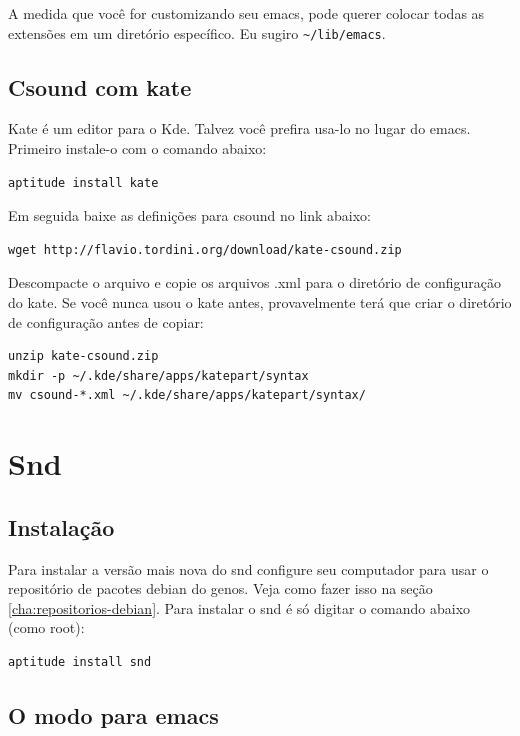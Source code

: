 \documentclass[12pt,brazil]{book}
\begin{document}
A medida que você for customizando seu emacs, pode querer colocar
todas as extensões em um diretório específico. Eu sugiro
\verb|~/lib/emacs|.

\section{Csound com kate}
\label{sec:csound-com-kate}

Kate é um editor para o Kde. Talvez você prefira usa-lo no lugar do
emacs. Primeiro instale-o com o comando abaixo:

\begin{verbatim}
aptitude install kate
\end{verbatim}

Em seguida baixe as definições para csound no link abaixo:

\begin{verbatim}
wget http://flavio.tordini.org/download/kate-csound.zip
\end{verbatim}

Descompacte o arquivo e copie os arquivos .xml para o diretório de
configuração do kate. Se você nunca usou o kate antes, provavelmente
terá que criar o diretório de configuração antes de copiar:

\begin{verbatim}
unzip kate-csound.zip
mkdir -p ~/.kde/share/apps/katepart/syntax
mv csound-*.xml ~/.kde/share/apps/katepart/syntax/
\end{verbatim}

\chapter{Snd}
\label{cha:snd}

\section{Instalação}
\label{sec:instalacao-5}

Para instalar a versão mais nova do snd configure seu computador para
usar o repositório de pacotes debian do genos. Veja como fazer isso na
seção \ref{cha:repositorios-debian}. Para instalar o snd é só digitar
o comando abaixo (como root):

\begin{verbatim}
aptitude install snd
\end{verbatim}

\section{O modo para emacs}
\label{sec:o-modo-para-1}
\end{document}
